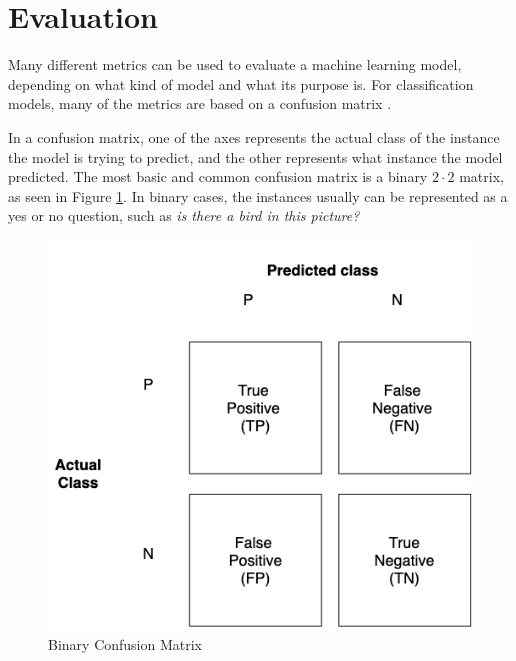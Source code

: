 \documentclass[nofilelist]{cslthse-msc}
\begin{document}









\section{Evaluation}
\label{sect:eval}
Many different metrics can be used to evaluate a machine learning model, depending on what kind of model and what its purpose is. For classification models, many of the metrics are based on a confusion matrix \citep{FAWCETT2006861}. 

In a confusion matrix, one of the axes represents the actual class of the instance the model is trying to predict, and the other represents what instance the model predicted. The most basic and common confusion matrix is a binary $2 \cdot 2$ matrix, as seen in Figure \ref{fig:confusion}. In binary cases, the instances usually can be represented as a yes or no question, such as \textit{is there a bird in this picture?}

\begin{figure}[h!]
    \centering
    \hspace*{-3cm}\includegraphics[width=\textwidth/2]{msccls/explanatory_images/confusion_matrix.png}
    \caption{Binary Confusion Matrix}
    \label{fig:confusion}
\end{figure}
\end{document}
